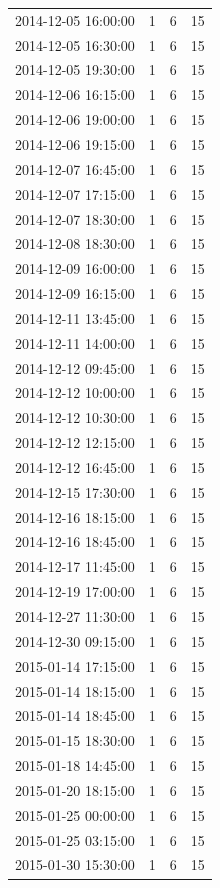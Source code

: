 \begin{tabular}{lrrr}
2014-12-05 16:00:00 & 1 & 6 & 15 \\
2014-12-05 16:30:00 & 1 & 6 & 15 \\
2014-12-05 19:30:00 & 1 & 6 & 15 \\
2014-12-06 16:15:00 & 1 & 6 & 15 \\
2014-12-06 19:00:00 & 1 & 6 & 15 \\
2014-12-06 19:15:00 & 1 & 6 & 15 \\
2014-12-07 16:45:00 & 1 & 6 & 15 \\
2014-12-07 17:15:00 & 1 & 6 & 15 \\
2014-12-07 18:30:00 & 1 & 6 & 15 \\
2014-12-08 18:30:00 & 1 & 6 & 15 \\
2014-12-09 16:00:00 & 1 & 6 & 15 \\
2014-12-09 16:15:00 & 1 & 6 & 15 \\
2014-12-11 13:45:00 & 1 & 6 & 15 \\
2014-12-11 14:00:00 & 1 & 6 & 15 \\
2014-12-12 09:45:00 & 1 & 6 & 15 \\
2014-12-12 10:00:00 & 1 & 6 & 15 \\
2014-12-12 10:30:00 & 1 & 6 & 15 \\
2014-12-12 12:15:00 & 1 & 6 & 15 \\
2014-12-12 16:45:00 & 1 & 6 & 15 \\
2014-12-15 17:30:00 & 1 & 6 & 15 \\
2014-12-16 18:15:00 & 1 & 6 & 15 \\
2014-12-16 18:45:00 & 1 & 6 & 15 \\
2014-12-17 11:45:00 & 1 & 6 & 15 \\
2014-12-19 17:00:00 & 1 & 6 & 15 \\
2014-12-27 11:30:00 & 1 & 6 & 15 \\
2014-12-30 09:15:00 & 1 & 6 & 15 \\
2015-01-14 17:15:00 & 1 & 6 & 15 \\
2015-01-14 18:15:00 & 1 & 6 & 15 \\
2015-01-14 18:45:00 & 1 & 6 & 15 \\
2015-01-15 18:30:00 & 1 & 6 & 15 \\
2015-01-18 14:45:00 & 1 & 6 & 15 \\
2015-01-20 18:15:00 & 1 & 6 & 15 \\
2015-01-25 00:00:00 & 1 & 6 & 15 \\
2015-01-25 03:15:00 & 1 & 6 & 15 \\
2015-01-30 15:30:00 & 1 & 6 & 15 \\

\end{tabular}
